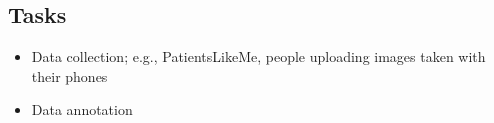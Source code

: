 \documentclass[10pt,twocolumn,letterpaper]{article}
\begin{document}
% 

% 
\subsection{Tasks}
\begin{itemize}
    \item Data collection; e.g., PatientsLikeMe, people uploading images taken with their phones
    \item Data annotation
\end{itemize}

\end{document}
